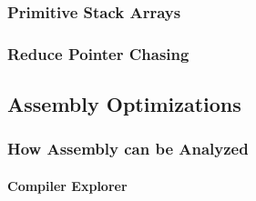 \subsubsection{Primitive Stack Arrays}
\subsubsection{Reduce Pointer Chasing}
\subsection{Assembly Optimizations}
\subsubsection{How Assembly can be Analyzed}
\paragraph{Compiler Explorer}
